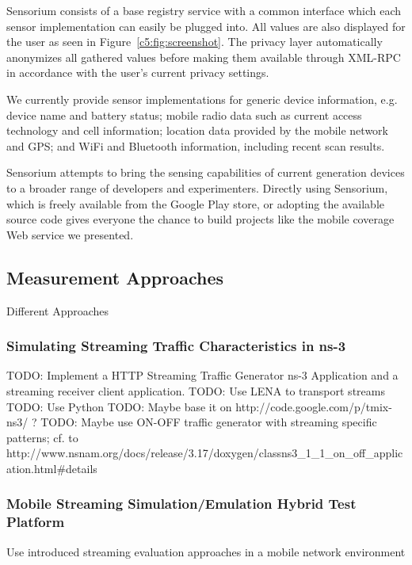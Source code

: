 Sensorium consists of a base registry service with a common interface which each sensor implementation can easily be plugged into. All values are also displayed for the user as seen in Figure~\ref{c5:fig:screenshot}. The privacy layer automatically anonymizes all gathered values before making them available through XML-RPC in accordance with the user's current privacy settings.

We currently provide sensor implementations for generic device information, e.g. device name and battery status; mobile radio data such as current access technology and cell information; location data provided by the mobile network and \gls{GPS}; and  WiFi and Bluetooth information, including recent scan results.

Sensorium attempts to bring the sensing capabilities of current generation devices to a broader range of developers and experimenters. Directly using Sensorium, which is freely available from the Google Play store, or adopting the available source code gives everyone the chance to build projects like the mobile coverage Web service we presented.


\subsection{Measurement Approaches}
\label{c5:mobilestreamingtestbed}

Different Approaches

\subsubsection{Simulating Streaming Traffic Characteristics in ns-3}

TODO: Implement a HTTP Streaming Traffic Generator ns-3 Application and a streaming receiver client application.
TODO: Use LENA to transport streams
TODO: Use Python
TODO: Maybe base it on http://code.google.com/p/tmix-ns3/ ?
TODO: Maybe use ON-OFF traffic generator with streaming specific patterns; cf. to http://www.nsnam.org/docs/release/3.17/doxygen/classns3\_1\_1\_on\_off\_application.html\#details


\subsubsection{Mobile Streaming Simulation/Emulation Hybrid Test Platform}

Use introduced streaming evaluation approaches in a mobile network environment

